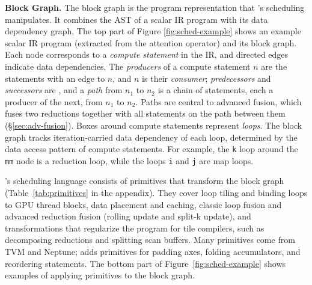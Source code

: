 \textbf{Block Graph.}
\label{sec:block-graph}
The block graph is the program representation that \NAME{}'s scheduling manipulates.
It combines the AST of a scalar IR program with its data dependency graph,
The top part of Figure \ref{fig:sched-example} shows an example scalar IR program
(extracted from the attention operator) and its block graph.
Each node corresponds to a \emph{compute statement} in the IR,
and directed edges indicate data dependencies.
The \emph{producers} of a compute statement $n$ are the statements with an edge to $n$,
and $n$ is their \emph{consumer};
\emph{predecessors} and \emph{successors} are ,
and a \emph{path} from $n_1$ to $n_2$ is a chain of statements, each a producer of the next,
from $n_1$ to $n_2$.
Paths are central to advanced fusion,
which fuses two reductions together with all statements on the path between them
(\S\ref{sec:adv-fusion}).
Boxes around compute statements represent \emph{loops}.
The block graph tracks iteration-carried data dependency of each loop,
determined by the data access pattern of compute statements.
For example, the \texttt{k} loop around the \texttt{mm} node is a reduction loop,
while the loops \texttt{i} and \texttt{j} are map loops.

\NAME{}'s scheduling language consists of primitives that transform the block graph
(Table~\ref{tab:primitives} in the appendix).
They cover loop tiling and binding loops to GPU thread blocks,
data placement and caching,
classic loop fusion and advanced reduction fusion (rolling update and split-k update),
and transformations that regularize the program for tile compilers,
such as decomposing reductions and splitting scan buffers.
Many primitives come from TVM and Neptune;
\NAME{} adds primitives for padding axes, folding accumulators, and reordering statements.
The bottom part of Figure~\ref{fig:sched-example} shows examples of applying primitives
to the block graph.
